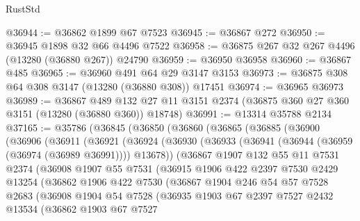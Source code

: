 \begin{lexlean}{RustStd}
\begin{coremodule}
@36944 := @36862 @1899 @67 @7523
@36945 := @36867 @272
@36950 := @36945 @1898 @32 @66 @4496 @7522
@36958 := @36875 @267 @32 @267 @4496 (@13280 (@36880 @267)) @24790
@36959 := @36950 @36958
@36960 := @36867 @485
@36965 := @36960 @491 @64 @29 @3147 @3153
@36973 := @36875 @308 @64 @308 @3147 (@13280 (@36880 @308)) @17451
@36974 := @36965 @36973
@36989 := @36867
    @489
    @132
    @27
    @11
    @3151
    @2374
    (@36875 @360 @27 @360 @3151 (@13280 (@36880 @360)) @18748)
@36991 := @13314 @35788 @2134
@37165 := @35786
    (@36845
      (@36850
        (@36860
          (@36865
            (@36885
              (@36900
                (@36906
                  (@36911
                    (@36921
                      (@36924
                        (@36930
                          (@36933 (@36941 (@36944 (@36959 (@36974 (@36989 @36991)))) @13678))
                          (@36867
                            @1907
                            @132
                            @55
                            @11
                            @7531
                            @2374
                            (@36908
                              @1907
                              @55
                              @7531
                              (@36915
                                @1906
                                @422
                                @2397
                                @7530
                                @2429
                                @13254
                                (@36862
                                  @1906
                                  @422
                                  @7530
                                  (@36867
                                    @1904
                                    @246
                                    @54
                                    @57
                                    @7528
                                    @2683
                                    (@36908
                                      @1904
                                      @54
                                      @7528
                                      (@36935
                                        @1903
                                        @67
                                        @2397
                                        @7527
                                        @2432
                                        @13534
                                        (@36862
                                          @1903
                                          @67
                                          @7527

\end{coremodule}
\end{lexlean}
